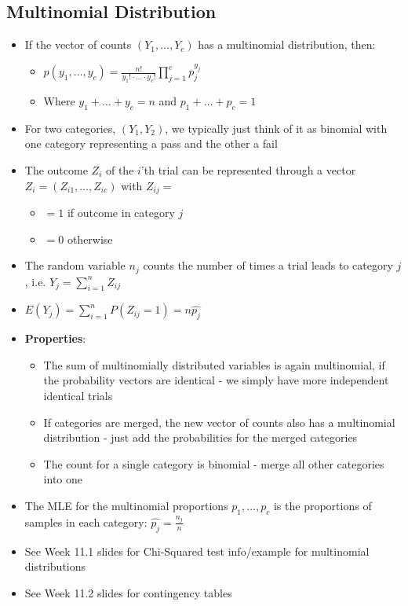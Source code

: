 \documentclass{article}
\begin{document}
\subsection{Multinomial Distribution}

\begin{itemize}
    \item If the vector of counts $(Y_1,\dots,Y_c)$ has a multinomial distribution, then:
    \begin{itemize}
        \item $p(y_1,\dots,y_c)=\frac{n!}{y_1! \cdot \dots \cdot y_c!} \prod_{j=1}^c p_j^{y_j}$
        \item Where $y_1+\dots+y_c=n$ and $p_1+\dots+p_c=1$
    \end{itemize}
    \item For two categories, $(Y_1, Y_2)$, we typically just think of it as binomial with one category representing a pass and the other a fail
    \item The outcome $Z_i$ of the $i$'th trial can be represented through a vector $Z_i=(Z_{i1},\dots,Z_{ic})$ with $Z_{ij}=$
    \begin{itemize}
        \item $=1$ if outcome in category $j$
        \item $=0$ otherwise
    \end{itemize}
    \item The random variable $n_j$ counts the number of times a trial leads to category $j$, i.e. $Y_j=\sum_{i=1}^n Z_{ij}$
    \item $E(Y_j)=\sum_{i=1}^n P(Z_{ij}=1)=n\hat{p_j}$
    \item \textbf{Properties}:
    \begin{itemize}
        \item The sum of multinomially distributed variables is again multinomial, if the probability vectors are identical - we simply have more independent identical trials
        \item If categories are merged, the new vector of counts also has a multinomial distribution - just add the probabilities for the merged categories
        \item The count for a single category is binomial - merge all other categories into one
    \end{itemize}
    \item The MLE for the multinomial proportions $p_1,...,p_c$ is the proportions of samples in each category: $\hat{p_j}=\frac{n_j}{n}$
    \item See Week 11.1 slides for Chi-Squared test info/example for multinomial distributions
    \item See Week 11.2 slides for contingency tables
\end{itemize}
\end{document}
